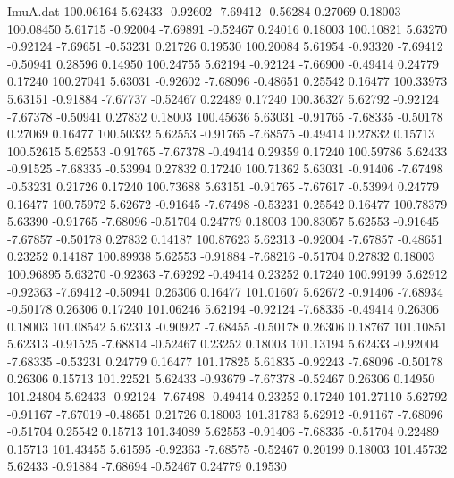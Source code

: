\begin{filecontents}{ImuA.dat}
 100.06164    5.62433   -0.92602   -7.69412   -0.56284    0.27069    0.18003
 100.08450    5.61715   -0.92004   -7.69891   -0.52467    0.24016    0.18003
 100.10821    5.63270   -0.92124   -7.69651   -0.53231    0.21726    0.19530
 100.20084    5.61954   -0.93320   -7.69412   -0.50941    0.28596    0.14950
 100.24755    5.62194   -0.92124   -7.66900   -0.49414    0.24779    0.17240
 100.27041    5.63031   -0.92602   -7.68096   -0.48651    0.25542    0.16477
 100.33973    5.63151   -0.91884   -7.67737   -0.52467    0.22489    0.17240
 100.36327    5.62792   -0.92124   -7.67378   -0.50941    0.27832    0.18003
 100.45636    5.63031   -0.91765   -7.68335   -0.50178    0.27069    0.16477
 100.50332    5.62553   -0.91765   -7.68575   -0.49414    0.27832    0.15713
 100.52615    5.62553   -0.91765   -7.67378   -0.49414    0.29359    0.17240
 100.59786    5.62433   -0.91525   -7.68335   -0.53994    0.27832    0.17240
 100.71362    5.63031   -0.91406   -7.67498   -0.53231    0.21726    0.17240
 100.73688    5.63151   -0.91765   -7.67617   -0.53994    0.24779    0.16477
 100.75972    5.62672   -0.91645   -7.67498   -0.53231    0.25542    0.16477
 100.78379    5.63390   -0.91765   -7.68096   -0.51704    0.24779    0.18003
 100.83057    5.62553   -0.91645   -7.67857   -0.50178    0.27832    0.14187
 100.87623    5.62313   -0.92004   -7.67857   -0.48651    0.23252    0.14187
 100.89938    5.62553   -0.91884   -7.68216   -0.51704    0.27832    0.18003
 100.96895    5.63270   -0.92363   -7.69292   -0.49414    0.23252    0.17240
 100.99199    5.62912   -0.92363   -7.69412   -0.50941    0.26306    0.16477
 101.01607    5.62672   -0.91406   -7.68934   -0.50178    0.26306    0.17240
 101.06246    5.62194   -0.92124   -7.68335   -0.49414    0.26306    0.18003
 101.08542    5.62313   -0.90927   -7.68455   -0.50178    0.26306    0.18767
 101.10851    5.62313   -0.91525   -7.68814   -0.52467    0.23252    0.18003
 101.13194    5.62433   -0.92004   -7.68335   -0.53231    0.24779    0.16477
 101.17825    5.61835   -0.92243   -7.68096   -0.50178    0.26306    0.15713
 101.22521    5.62433   -0.93679   -7.67378   -0.52467    0.26306    0.14950
 101.24804    5.62433   -0.92124   -7.67498   -0.49414    0.23252    0.17240
 101.27110    5.62792   -0.91167   -7.67019   -0.48651    0.21726    0.18003
 101.31783    5.62912   -0.91167   -7.68096   -0.51704    0.25542    0.15713
 101.34089    5.62553   -0.91406   -7.68335   -0.51704    0.22489    0.15713
 101.43455    5.61595   -0.92363   -7.68575   -0.52467    0.20199    0.18003
 101.45732    5.62433   -0.91884   -7.68694   -0.52467    0.24779    0.19530

\end{filecontents}
